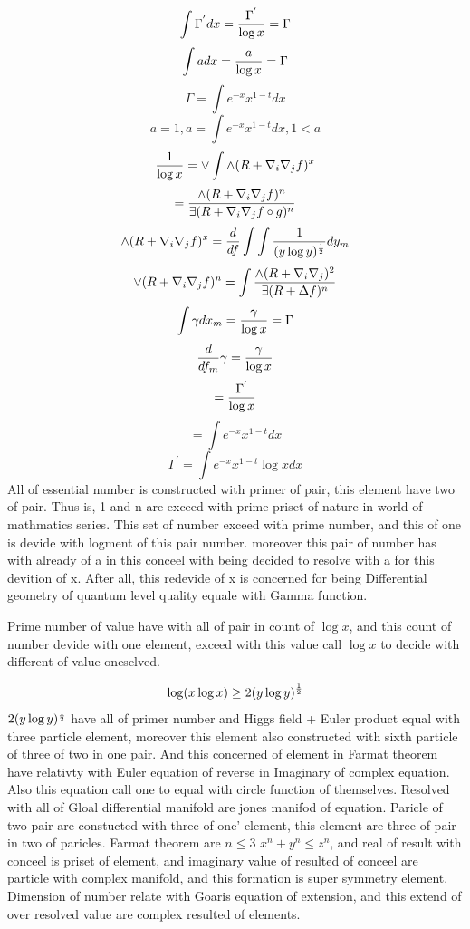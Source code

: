 \documentclass{jsarticle}
\begin{document}
{   $$ \int \Gamma^{'} dx = {\Gamma^{'} \over \log x}
   = \Gamma $$
   $$ \int a dx = {a \over \log x} = \Gamma $$
   $$ \Gamma = \int e^{-x} x^{1 - t} dx $$
   $$ a = 1, a = \int e^{-x} x^{1 - t} dx , 1 < a $$
   $$ {1 \over \log x} = \vee \int \wedge (R + \nabla_{i}\nabla_{j}f)^{x} $$
   $$ = {{\wedge {(R + \nabla_{i}\nabla_{j}f)^{n}}} \over 
   {\exists(R + \nabla_{i}\nabla_{j} f \circ g)^{n} }} $$
   $$ \wedge(R + \nabla_{i}\nabla_{j}f)^{x} = {d \over df}\int \int{
	   1 \over (y \log y)^{1 \over 2}}dy_m $$
   $$ {\vee(R + \nabla_{i}\nabla_{j}f)^{n}} = \int {
	   {\wedge(R + \nabla_{i}\nabla_{j})^2 \over {\exists(R + \Delta f)^n}
	   }} $$
   $$ \int \gamma dx_m = {\gamma \over \log x} = \Gamma  $$
   $$ {d \over df_m}\gamma = {\gamma \over \log x} $$
   $$ = {\Gamma^{'} \over \log x} $$
   $$ = \int e^{-x} x^{1 - t} dx $$
   $$ \Gamma^{'} = \int e^{-x}x^{1 - t}\log x dx $$
   All of essential number is constructed with primer of pair,
   this element have two of pair. Thus is, 1 and n are exceed with prime
   priset of nature in world of mathmatics series.
   This set of number exceed with prime number, and this of one
   is devide with logment of this pair number. moreover
   this pair of number has with already of a in this conceel with being
   decided to resolve with a for this devition of x.
   After all, this redevide of x is concerned for being Differential
   geometry of quantum level quality equale with Gamma function.

   Prime number of value have with all of pair in count of $\log x $,
   and this count of number devide with one element, exceed with
   this value call $\log x$ to decide with different of value oneselved.

   $$ \log (x \log x) \ge 2(y \log y)^{1 \over 2} $$
   $ 2 (y \log y)^{1 \over 2}$ have all of primer number
   and Higgs field + Euler product equal with three particle element,
   moreover this element also constructed with sixth particle of three
   of two in one pair.
   And this concerned of element in Farmat theorem have relativty 
   with Euler equation of reverse in Imaginary of complex equation.
   Also this equation call one to equal with circle function of
   themselves.
   Resolved with all of Gloal differential manifold are jones manifod
   of equation.
   Paricle of two pair are constucted with three of one' element,
   this element are three of pair in two of paricles.
   Farmat theorem are $ n \le 3 $ $ x^n + y^n \le z^n $, and
   real of result with conceel is priset of element, and
   imaginary value of resulted of conceel are particle with
   complex manifold, and this formation is super symmetry element.
   Dimension of number relate with Goaris equation of extension,
   and this extend of over resolved value are complex resulted of
   elements.

}
\end{document}
